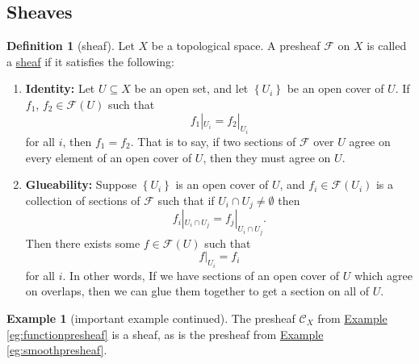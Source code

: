 \documentclass[a4paper,10pt]{scrreprt}
\newcommand{\defn}[1]{\ul{#1}}
\theoremstyle{definition}
\newtheorem{definition}{Definition}[section]
\newtheorem{example}{Example}[section]
\theoremstyle{plain}
\theoremstyle{remark}
\begin{document}
\subsection{Sheaves}
\begin{definition}[sheaf]
  \label{def:sheaf}
  Let $X$ be a topological space. A presheaf $\mathcal{F}$ on $X$ is called a \defn{sheaf} if it satisfies the following:
  \begin{enumerate}
    \item \textbf{Identity:} Let $U \subseteq X$ be an open set, and let $\left\{ U_{i} \right\}$ be an open cover of $U$. If $f_{1}$, $f_{2} \in \mathcal{F}(U)$ such that
      \begin{equation*}
        f_{1}|_{U_{i}} = f_{2}|_{U_{i}}
      \end{equation*}
      for all $i$, then $f_{1} = f_{2}$. That is to say, if two sections of $\mathcal{F}$ over $U$ agree on every element of an open cover of $U$, then they must agree on $U$.

    \item \textbf{Glueability:} Suppose $\left\{ U_{i} \right\}$ is an open cover of $U$, and $f_{i} \in \mathcal{F}(U_{i})$ is a collection of sections of $\mathcal{F}$ such that if $U_{i} \cap U_{j} \neq \emptyset$ then
      \begin{equation*}
        f_{i}|_{U_{i} \cap U_{j}} = f_{j}|_{U_{i} \cap U_{j}}.
      \end{equation*}
      Then there exists some $f \in \mathcal{F}(U)$ such that 
      \begin{equation*}
        f|_{U_{i}} = f_{i}
      \end{equation*}
      for all $i$. In other words, If we have sections of an open cover of $U$ which agree on overlaps, then we can glue them together to get a section on all of $U$.
  \end{enumerate}
\end{definition}

\begin{example}[important example continued]
  \label{eg:functionsheaf}
  The presheaf $\mathcal{C}_{X}$ from \hyperref[eg:functionpresheaf]{Example \ref*{eg:functionpresheaf}} is a sheaf, as is the presheaf from \hyperref[eg:smoothpresheaf]{Example \ref*{eg:smoothpresheaf}}.
\end{example}
\end{document}
